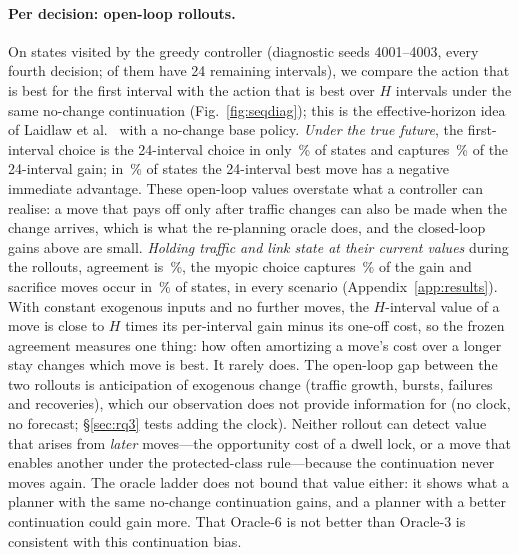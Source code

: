 \paragraph{Per decision: open-loop rollouts.} On \SeqLiveStatesHOne{} states
visited by the greedy controller (diagnostic seeds 4001--4003, every fourth
decision; \SeqLiveStates{} of them have 24 remaining intervals), we compare the
action that is best for the first interval with the action that is best over
$H$ intervals under the same no-change continuation (Fig.~\ref{fig:seqdiag});
this is the effective-horizon idea of Laidlaw et
al.~\citep{laidlaw2023effective} with a no-change base policy. \emph{Under the
true future}, the first-interval choice is the 24-interval choice in only
\SeqLiveAgreeHTwentyFour\,\% of states and captures
\SeqLiveCapturedHTwentyFour\,\% of the 24-interval gain; in
\SeqLiveSacrificeHTwentyFour\,\% of states the 24-interval best move has a
negative immediate advantage. These open-loop values overstate what a
controller can realise: a move that pays off only after traffic changes can
also be made when the change arrives, which is what the re-planning oracle
does, and the closed-loop gains above are small. \emph{Holding traffic and
link state at their current values} during the rollouts, agreement is
\SeqFrozenAgreeHTwentyFour\,\%, the myopic choice captures
\SeqFrozenCapturedHTwentyFour\,\% of the gain and sacrifice moves occur in
\SeqFrozenSacrificeHTwentyFour\,\% of states, in every scenario
(Appendix~\ref{app:results}). With constant exogenous inputs and no further
moves, the $H$-interval value of a move is close to $H$ times its per-interval
gain minus its one-off cost, so the frozen agreement measures one thing: how
often amortizing a move's cost over a longer stay changes which move is best.
It rarely does. The open-loop gap between the two rollouts is anticipation of
exogenous change (traffic growth, bursts, failures and recoveries), which our
observation does not provide information for (no clock, no forecast; \S\ref{sec:rq3}
tests adding the clock). Neither rollout can detect value that arises from
\emph{later} moves---the opportunity cost of a dwell lock, or a move that
enables another under the protected-class rule---because the continuation
never moves again. The oracle ladder does not bound that value either: it
shows what a planner with the same no-change continuation gains, and a planner
with a better continuation could gain more. That Oracle-6 is not better than
Oracle-3 is consistent with this continuation bias.

